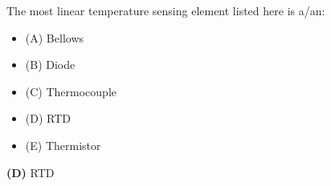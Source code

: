 

The most linear temperature sensing element listed here is a/an:

\begin{itemize}
\item{(A)} Bellows
\vskip 5pt 
\item{(B)} Diode
\vskip 5pt 
\item{(C)} Thermocouple
\vskip 5pt 
\item{(D)} RTD
\vskip 5pt 
\item{(E)} Thermistor
\end{itemize}







{\bf (D)} RTD
 









